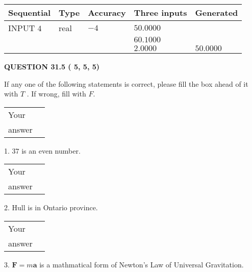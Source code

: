 \documentclass[12pt]{article}
\begin{document}
   
  
  
\noindent\begin{tabular}{|l|l|l|l|l|}
\hline
 Sequential & Type & Accuracy & Three inputs & Generated \\ 
\hline
 
 
  INPUT $           4$ & real & $          -4 $ & $
 50.0000
  $ & \\
  & & &  $
 60.1000
  $ & \\
  & & &  $
 2.0000
 $ & $ 50.0000 $ 
 \\  \hline  
 \end{tabular}
   
   
  
\vspace{0.2in}
  
{\textbf{\Large{QUESTION
31.5 
 (          5,          5,          5)
}}}
  
  
If any one of the following statements is correct, please fill the box ahead of it with $T$ .
If wrong, fill with $F$.
 
\noindent\begin{tabular}{|l|l|}\hline Your&\hspace{.2in} \\ answer&\hspace{.2in} \\ \hline \end{tabular}
1. $ %
37$ is an  %
even number.
 
\noindent\begin{tabular}{|l|l|}\hline Your&\hspace{.2in} \\ answer&\hspace{.2in} \\ \hline \end{tabular}
2.  %
Hull is in  %
Ontario province.
 
\noindent\begin{tabular}{|l|l|}\hline Your&\hspace{.2in} \\ answer&\hspace{.2in} \\ \hline \end{tabular}
3.  %
$\mathbf{F}=m\mathbf{a}$ is a mathmatical form of
Newton's Law of Universal Gravitation.
 
 
 
\noindent{}
 
 
\end{document}
